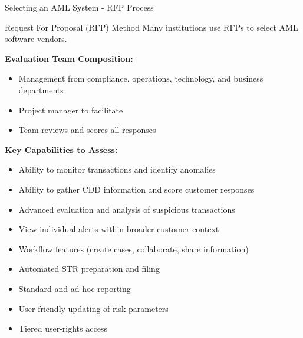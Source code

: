 \documentclass[11pt,a4paper]{beamer}
\begin{document}
	\begin{frame}{Selecting an AML System - RFP Process}
		\begin{block}{Request For Proposal (RFP) Method}
			Many institutions use RFPs to select AML software vendors.
		\end{block}
		\textbf{Evaluation Team Composition:}
		\begin{itemize}
			\item Management from compliance, operations, technology, and business departments
			\item Project manager to facilitate
			\item Team reviews and scores all responses
		\end{itemize}
		\textbf{Key Capabilities to Assess:}
		\begin{itemize}
			\item Ability to monitor transactions and identify anomalies
			\item Ability to gather CDD information and score customer responses
			\item Advanced evaluation and analysis of suspicious transactions
			\item View individual alerts within broader customer context
			\item Workflow features (create cases, collaborate, share information)
			\item Automated STR preparation and filing
			\item Standard and ad-hoc reporting
			\item User-friendly updating of risk parameters
			\item Tiered user-rights access
		\end{itemize}
	\end{frame}
	
\end{document}
